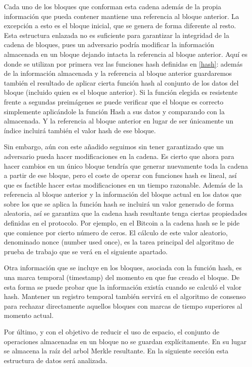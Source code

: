 Cada uno de los bloques que conforman esta cadena además de la propia información que pueda contener mantiene una referencia al bloque anterior. La excepción a esto es el bloque inicial, que se genera de forma diferente al resto.
Esta estructura enlazada no es suficiente para garantizar la integridad de la cadena de bloques, pues un adversario podría modificar la información almacenada en un bloque dejando intacta la referencia al bloque anterior. Aquí es donde se utilizan por primera vez las funciones hash definidas en \ref{hash}: además de la información almacenada y la referencia al bloque anterior guardaremos también el resultado de aplicar cierta función hash al conjunto de los datos del bloque (incluido quien es el bloque anterior). Si la función elegida es resistente frente a segundas preimágenes se puede verificar que  el bloque es correcto simplemente aplicándole la función Hash a sus datos y comparando con la almacenada. Y la referencia al bloque anterior en lugar de ser únicamente un índice incluirá también el valor hash de ese bloque.

Sin embargo, aún con este añadido seguimos sin tener garantizado que un adversario pueda hacer modificaciones en la cadena. Es cierto que ahora para hacer cambios en un único bloque tendría que generar nuevamente toda la cadena a partir de ese bloque, pero el coste de operar con funciones hash es lineal, así que es factible hacer estas modificaciones en un tiempo razonable. Además de la referencia al bloque anterior y la información del bloque actual en los datos que sobre los que se aplica la función hash se incluirá un valor generado de forma aleatoria, así se garantiza que la cadena hash resultante tenga ciertas propiedades definidas en el protocolo. Por ejemplo, en el Bitcoin a la cadena hash se le pide que comience por cierto número de ceros. El cálculo de este valor aleatorio, denominado nonce (number used once), es la tarea principal del algoritmo de prueba de trabajo que se verá en el siguiente apartado.

Otra información que se incluye en los bloques, asociada con la función hash, es una marca temporal (timestamp) del momento en que fue creado el bloque. De esta forma se puede probar que la información existía cuando se calculó el valor hash. Mantener un registro temporal también servirá en el algoritmo de consenso para rechazar directamente aquellos bloques con marcas de tiempo superiores al momento actual.

Por último, y con el objetivo de reducir el uso de espacio, el conjunto de operaciones almacenadas en un bloque no se guardan explícitamente. En su lugar se almacena la raíz del arbol Merkle resultante. En la siguiente sección esta estructura de datos será analizada.

